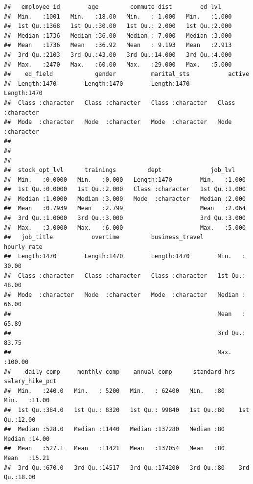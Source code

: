 \documentclass[]{book}
\begin{document}
\begin{verbatim}
##   employee_id        age         commute_dist        ed_lvl     
##  Min.   :1001   Min.   :18.00   Min.   : 1.000   Min.   :1.000  
##  1st Qu.:1368   1st Qu.:30.00   1st Qu.: 2.000   1st Qu.:2.000  
##  Median :1736   Median :36.00   Median : 7.000   Median :3.000  
##  Mean   :1736   Mean   :36.92   Mean   : 9.193   Mean   :2.913  
##  3rd Qu.:2103   3rd Qu.:43.00   3rd Qu.:14.000   3rd Qu.:4.000  
##  Max.   :2470   Max.   :60.00   Max.   :29.000   Max.   :5.000  
##    ed_field            gender          marital_sts           active         
##  Length:1470        Length:1470        Length:1470        Length:1470       
##  Class :character   Class :character   Class :character   Class :character  
##  Mode  :character   Mode  :character   Mode  :character   Mode  :character  
##                                                                             
##                                                                             
##                                                                             
##  stock_opt_lvl      trainings         dept              job_lvl     
##  Min.   :0.0000   Min.   :0.000   Length:1470        Min.   :1.000  
##  1st Qu.:0.0000   1st Qu.:2.000   Class :character   1st Qu.:1.000  
##  Median :1.0000   Median :3.000   Mode  :character   Median :2.000  
##  Mean   :0.7939   Mean   :2.799                      Mean   :2.064  
##  3rd Qu.:1.0000   3rd Qu.:3.000                      3rd Qu.:3.000  
##  Max.   :3.0000   Max.   :6.000                      Max.   :5.000  
##   job_title           overtime         business_travel     hourly_rate    
##  Length:1470        Length:1470        Length:1470        Min.   : 30.00  
##  Class :character   Class :character   Class :character   1st Qu.: 48.00  
##  Mode  :character   Mode  :character   Mode  :character   Median : 66.00  
##                                                           Mean   : 65.89  
##                                                           3rd Qu.: 83.75  
##                                                           Max.   :100.00  
##    daily_comp     monthly_comp    annual_comp      standard_hrs salary_hike_pct
##  Min.   :240.0   Min.   : 5200   Min.   : 62400   Min.   :80    Min.   :11.00  
##  1st Qu.:384.0   1st Qu.: 8320   1st Qu.: 99840   1st Qu.:80    1st Qu.:12.00  
##  Median :528.0   Median :11440   Median :137280   Median :80    Median :14.00  
##  Mean   :527.1   Mean   :11421   Mean   :137054   Mean   :80    Mean   :15.21  
##  3rd Qu.:670.0   3rd Qu.:14517   3rd Qu.:174200   3rd Qu.:80    3rd Qu.:18.00  

\end{verbatim}
\end{document}
